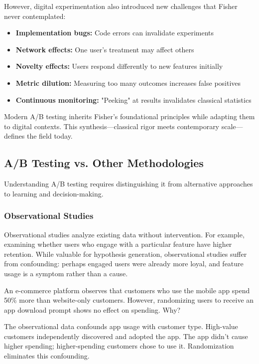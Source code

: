 However, digital experimentation also introduced new challenges that Fisher never contemplated:
\begin{itemize}
    \item \textbf{Implementation bugs:} Code errors can invalidate experiments
    \item \textbf{Network effects:} One user's treatment may affect others
    \item \textbf{Novelty effects:} Users respond differently to new features initially
    \item \textbf{Metric dilution:} Measuring too many outcomes increases false positives
    \item \textbf{Continuous monitoring:} "Peeking" at results invalidates classical statistics
\end{itemize}

Modern A/B testing inherits Fisher's foundational principles while adapting them to digital contexts. This synthesis—classical rigor meets contemporary scale—defines the field today.

\subsection{A/B Testing vs. Other Methodologies}

Understanding A/B testing requires distinguishing it from alternative approaches to learning and decision-making.

\subsubsection{Observational Studies}

Observational studies analyze existing data without intervention. For example, examining whether users who engage with a particular feature have higher retention. While valuable for hypothesis generation, observational studies suffer from confounding: perhaps engaged users were already more loyal, and feature usage is a symptom rather than a cause.

\begin{example}
An e-commerce platform observes that customers who use the mobile app spend 50\% more than website-only customers. However, randomizing users to receive an app download prompt shows no effect on spending. Why?

The observational data confounds app usage with customer type. High-value customers independently discovered and adopted the app. The app didn't cause higher spending; higher-spending customers chose to use it. Randomization eliminates this confounding.
\end{example}

